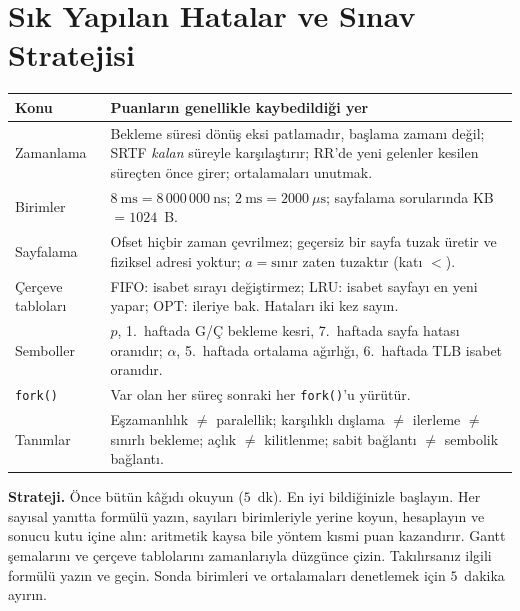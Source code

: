 \documentclass[11pt,a4paper]{article}
\newcommand{\cmd}[1]{\texttt{#1}}
\begin{document}
\section{Sık Yapılan Hatalar ve Sınav Stratejisi}
\label{sec:mistakes}
\begin{center}
\renewcommand{\arraystretch}{1.25}
\begin{tabularx}{\linewidth}{@{}>{\raggedright\arraybackslash}p{3.0cm} X@{}}
\toprule
\textbf{Konu} & \textbf{Puanların genellikle kaybedildiği yer} \\
\midrule
Zamanlama & Bekleme süresi dönüş eksi patlamadır, başlama zamanı değil; SRTF \emph{kalan} süreyle karşılaştırır; RR'de yeni gelenler kesilen süreçten önce girer; ortalamaları unutmak. \\
Birimler & $8\ \text{ms} = 8\,000\,000\ \text{ns}$; $2\ \text{ms} = 2000\ \mu\text{s}$; sayfalama sorularında KB $= 1024$~B. \\
Sayfalama & Ofset hiçbir zaman çevrilmez; geçersiz bir sayfa tuzak üretir ve fiziksel adresi yoktur; $a = \text{sınır}$ zaten tuzaktır (katı $<$). \\
Çerçeve tabloları & FIFO: isabet sırayı değiştirmez; LRU: isabet sayfayı en yeni yapar; OPT: ileriye bak. Hataları iki kez sayın. \\
Semboller & $p$, 1.~haftada G/Ç bekleme kesri, 7.~haftada sayfa hatası oranıdır; $\alpha$, 5.~haftada ortalama ağırlığı, 6.~haftada TLB isabet oranıdır. \\
\cmd{fork()} & Var olan her süreç sonraki her \cmd{fork()}'u yürütür. \\
Tanımlar & Eşzamanlılık $\ne$ paralellik; karşılıklı dışlama $\ne$ ilerleme $\ne$ sınırlı bekleme; açlık $\ne$ kilitlenme; sabit bağlantı $\ne$ sembolik bağlantı. \\
\bottomrule
\end{tabularx}
\end{center}
\textbf{Strateji.} Önce bütün kâğıdı okuyun ($5$~dk). En iyi bildiğinizle başlayın. Her sayısal yanıtta formülü yazın, sayıları birimleriyle yerine koyun, hesaplayın ve sonucu kutu içine alın: aritmetik kaysa bile yöntem kısmi puan kazandırır. Gantt şemalarını ve çerçeve tablolarını zamanlarıyla düzgünce çizin. Takılırsanız ilgili formülü yazın ve geçin. Sonda birimleri ve ortalamaları denetlemek için $5$~dakika ayırın.

\newpage
\end{document}

